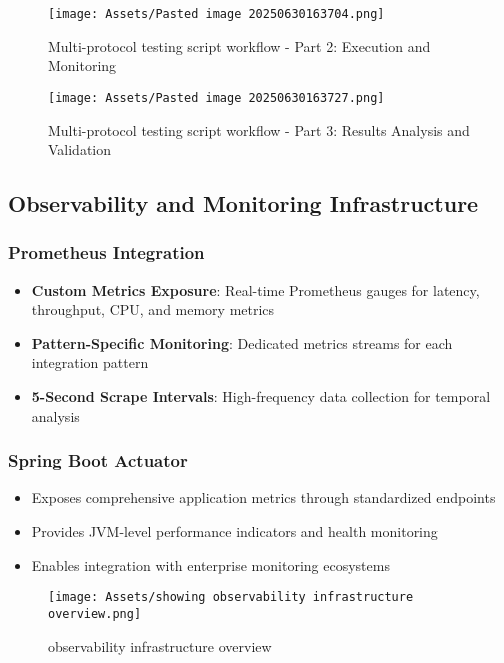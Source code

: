 \begin{figure}[H]
    \centering
    \texttt{[image: Assets/Pasted image 20250630163704.png]}
    \caption{Multi-protocol testing script workflow - Part 2: Execution and Monitoring}
    \label{fig:testing_workflow_part2}
\end{figure}

\begin{figure}[H]
    \centering
    \texttt{[image: Assets/Pasted image 20250630163727.png]}
    \caption{Multi-protocol testing script workflow - Part 3: Results Analysis and Validation}
    \label{fig:testing_workflow_part3}
\end{figure}


\subsection{Observability and Monitoring Infrastructure}

\subsubsection{Prometheus Integration}
\begin{itemize}
    \item \textbf{Custom Metrics Exposure}: Real-time Prometheus gauges for latency, throughput, CPU, and memory metrics
    \item \textbf{Pattern-Specific Monitoring}: Dedicated metrics streams for each integration pattern
    \item \textbf{5-Second Scrape Intervals}: High-frequency data collection for temporal analysis
\end{itemize}

\subsubsection{Spring Boot Actuator}
\begin{itemize}
    \item Exposes comprehensive application metrics through standardized endpoints
    \item Provides JVM-level performance indicators and health monitoring
    \item Enables integration with enterprise monitoring ecosystems
\end{itemize}

\begin{figure}[H]
    \centering
    \texttt{[image: Assets/showing observability infrastructure overview.png]}
    \caption{observability infrastructure overview}
\end{figure}


